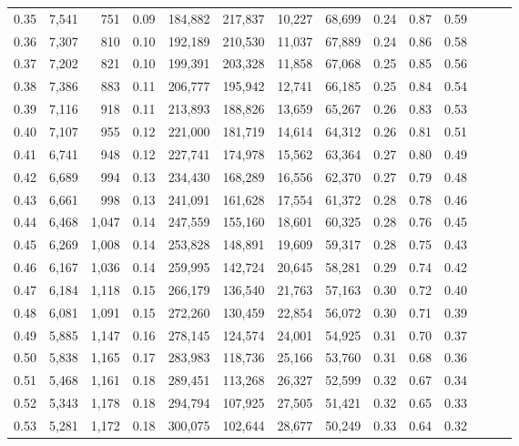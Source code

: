 \begin{tabular}{rrrrrrrrrrrrrr}
0.35 &  7,541 &    751 &  0.09 &  184,882 &  217,837 &  10,227 &  68,699 &  0.24 &  0.87 &      0.59 \\
0.36 &  7,307 &    810 &  0.10 &  192,189 &  210,530 &  11,037 &  67,889 &  0.24 &  0.86 &      0.58 \\
0.37 &  7,202 &    821 &  0.10 &  199,391 &  203,328 &  11,858 &  67,068 &  0.25 &  0.85 &      0.56 \\
0.38 &  7,386 &    883 &  0.11 &  206,777 &  195,942 &  12,741 &  66,185 &  0.25 &  0.84 &      0.54 \\
0.39 &  7,116 &    918 &  0.11 &  213,893 &  188,826 &  13,659 &  65,267 &  0.26 &  0.83 &      0.53 \\
0.40 &  7,107 &    955 &  0.12 &  221,000 &  181,719 &  14,614 &  64,312 &  0.26 &  0.81 &      0.51 \\
0.41 &  6,741 &    948 &  0.12 &  227,741 &  174,978 &  15,562 &  63,364 &  0.27 &  0.80 &      0.49 \\
0.42 &  6,689 &    994 &  0.13 &  234,430 &  168,289 &  16,556 &  62,370 &  0.27 &  0.79 &      0.48 \\
0.43 &  6,661 &    998 &  0.13 &  241,091 &  161,628 &  17,554 &  61,372 &  0.28 &  0.78 &      0.46 \\
0.44 &  6,468 &  1,047 &  0.14 &  247,559 &  155,160 &  18,601 &  60,325 &  0.28 &  0.76 &      0.45 \\
0.45 &  6,269 &  1,008 &  0.14 &  253,828 &  148,891 &  19,609 &  59,317 &  0.28 &  0.75 &      0.43 \\
0.46 &  6,167 &  1,036 &  0.14 &  259,995 &  142,724 &  20,645 &  58,281 &  0.29 &  0.74 &      0.42 \\
0.47 &  6,184 &  1,118 &  0.15 &  266,179 &  136,540 &  21,763 &  57,163 &  0.30 &  0.72 &      0.40 \\
0.48 &  6,081 &  1,091 &  0.15 &  272,260 &  130,459 &  22,854 &  56,072 &  0.30 &  0.71 &      0.39 \\
0.49 &  5,885 &  1,147 &  0.16 &  278,145 &  124,574 &  24,001 &  54,925 &  0.31 &  0.70 &      0.37 \\
0.50 &  5,838 &  1,165 &  0.17 &  283,983 &  118,736 &  25,166 &  53,760 &  0.31 &  0.68 &      0.36 \\
0.51 &  5,468 &  1,161 &  0.18 &  289,451 &  113,268 &  26,327 &  52,599 &  0.32 &  0.67 &      0.34 \\
0.52 &  5,343 &  1,178 &  0.18 &  294,794 &  107,925 &  27,505 &  51,421 &  0.32 &  0.65 &      0.33 \\
0.53 &  5,281 &  1,172 &  0.18 &  300,075 &  102,644 &  28,677 &  50,249 &  0.33 &  0.64 &      0.32 \\

\end{tabular}
